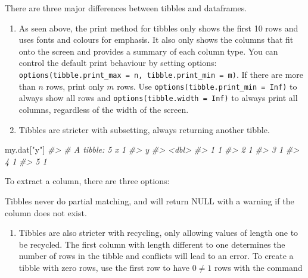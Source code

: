 \documentclass[
]{book}
\newenvironment{Shaded}{\begin{snugshade}}{\end{snugshade}}
\newcommand{\CommentTok}[1]{\textcolor[rgb]{0.56,0.35,0.01}{\textit{#1}}}
\newcommand{\DecValTok}[1]{\textcolor[rgb]{0.00,0.00,0.81}{#1}}
\newcommand{\NormalTok}[1]{#1}
\newcommand{\SpecialCharTok}[1]{\textcolor[rgb]{0.81,0.36,0.00}{\textbf{#1}}}
\newcommand{\StringTok}[1]{\textcolor[rgb]{0.31,0.60,0.02}{#1}}
\providecommand{\tightlist}{%
  \setlength{\itemsep}{0pt}\setlength{\parskip}{0pt}}
\begin{document}
There are three major differences between tibbles and dataframes.

\begin{enumerate}
\def\labelenumi{(\alph{enumi})}
\item
  As seen above, the print method for tibbles only shows the first 10 rows and uses fonts and colours for emphasis. It also only shows the columns that fit onto the screen and provides a summary of each column type. You can control the default print behaviour by setting options: \texttt{options(tibble.print\_max\ =\ n,\ tibble.print\_min\ =\ m)}. If there are more than \(n\) rows, print only \(m\) rows. Use \texttt{options(tibble.print\_min\ =\ Inf)} to always show all rows and \texttt{options(tibble.width\ =\ Inf)} to always print all columns, regardless of the width of the screen.
\item
  Tibbles are stricter with subsetting, always returning another tibble.
\end{enumerate}

\begin{Shaded}
\begin{Highlighting}[]
\NormalTok{my.dat[}\StringTok{"y"}\NormalTok{]}
\CommentTok{\#\textgreater{} \# A tibble: 5 x 1}
\CommentTok{\#\textgreater{}       y}
\CommentTok{\#\textgreater{}   \textless{}dbl\textgreater{}}
\CommentTok{\#\textgreater{} 1     1}
\CommentTok{\#\textgreater{} 2     1}
\CommentTok{\#\textgreater{} 3     1}
\CommentTok{\#\textgreater{} 4     1}
\CommentTok{\#\textgreater{} 5     1}
\end{Highlighting}
\end{Shaded}

To extract a column, there are three options:

\begin{Shaded}
\end{Shaded}

Tibbles never do partial matching, and will return NULL with a warning if the column does not exist.

\begin{enumerate}
\def\labelenumi{(\alph{enumi})}
\setcounter{enumi}{2}
\tightlist
\item
  Tibbles are also stricter with recycling, only allowing values of length one to be recycled. The first column with length different to one determines the number of rows in the tibble and conflicts will lead to an error. To create a tibble with zero rows, use the first row to have \(0 \neq 1\) rows with the command
\end{enumerate}
\end{document}
